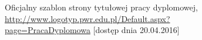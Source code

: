 \begin{figure}[b]
	\centering
	\caption{Oficjalny szablon strony tytułowej pracy dyplomowej, \url{http://www.logotyp.pwr.edu.pl/Default.aspx?page=PracaDyplomowa} [dostęp dnia 20.04.2016]}
	\label{fig:stronaTytulowa}
\end{figure}

